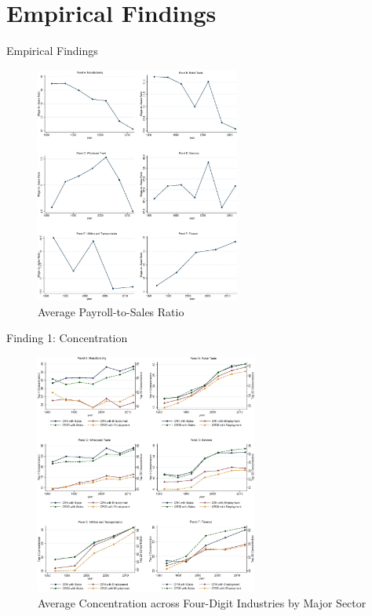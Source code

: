 \documentclass[
  10pt,
  ignorenonframetext,
  aspectratio=43,
]{beamer}
\begin{document}
\hypertarget{empirical-findings}{%
\section{Empirical Findings}\label{empirical-findings}}

\begin{frame}{Empirical Findings}
\begin{figure}
\centering
\includegraphics[width=0.6\textwidth,height=\textheight]{./images/Pasted image 20220516203135.png}
\caption{Average Payroll-to-Sales Ratio}
\end{figure}
\end{frame}

\begin{frame}{Finding 1: Concentration}
\protect\hypertarget{finding-1-concentration}{}
\begin{figure}
\centering
\includegraphics[width=0.65\textwidth,height=\textheight]{./images/Pasted image 20220516204018.png}
\caption{Average Concentration across Four-Digit Industries by Major
Sector}
\end{figure}
\end{frame}
\end{document}

